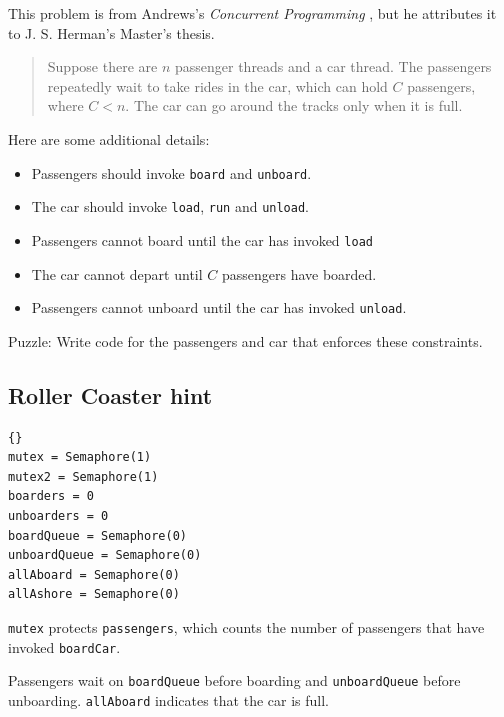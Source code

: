 \documentclass{book}
\newcommand{\clearemptydoublepage}{\newpage\cleardoublepage}
\begin{document}
This problem is from Andrews's {\em Concurrent
Programming} \cite{andrews}, but he attributes it to J. S. Herman's
Master's thesis.

\begin {quotation}
Suppose there are $n$ passenger threads and a car thread.  The passengers
repeatedly wait to take rides in the car, which can hold $C$ passengers,
where $C<n$.  The car can go around the tracks only when it is full.
\end{quotation}

Here are some additional details:

\begin{itemize}

\item Passengers should invoke {\tt board} and {\tt unboard}.

\item The car should invoke {\tt load}, {\tt run} and {\tt unload}.

\item Passengers cannot board until the car has invoked {\tt load}

\item The car cannot depart until $C$ passengers have boarded.

\item Passengers cannot unboard until the car
has invoked {\tt unload}.

\end{itemize}

Puzzle: Write code for the passengers and car that enforces these
constraints.


\clearemptydoublepage
\subsection{Roller Coaster hint}

\begin{lstlisting}[caption={Roller Coaster hint}]{}
mutex = Semaphore(1)
mutex2 = Semaphore(1)
boarders = 0
unboarders = 0
boardQueue = Semaphore(0)
unboardQueue = Semaphore(0)
allAboard = Semaphore(0)
allAshore = Semaphore(0)
\end{lstlisting}

{\tt mutex} protects {\tt passengers}, which counts the number of
passengers that have invoked {\tt boardCar}.  

Passengers wait on {\tt boardQueue} before boarding and
{\tt unboardQueue} before unboarding.  {\tt allAboard}
indicates that the car is full.
\end{document}
